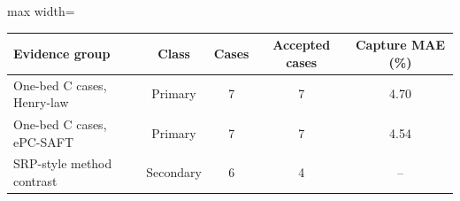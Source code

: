 \begin{center}
    \centering
    \small
    \label{tab:validation-evidence-registry}
    \renewcommand{\arraystretch}{1.2}
    \begin{adjustbox}{max width=\textwidth}
    \begin{tabular}{lcccc}
        \toprule
        \textbf{Evidence group} & \textbf{Class} & \textbf{Cases} & \textbf{Accepted cases} & \textbf{Capture MAE (\%)} \\
        \midrule
        One-bed C cases, Henry-law & Primary & 7 & 7 & 4.70 \\
        One-bed C cases, ePC-SAFT & Primary & 7 & 7 & 4.54 \\
        SRP-style method contrast & Secondary & 6 & 4 & -- \\
        \bottomrule
    \end{tabular}
    \end{adjustbox}
\end{center}
